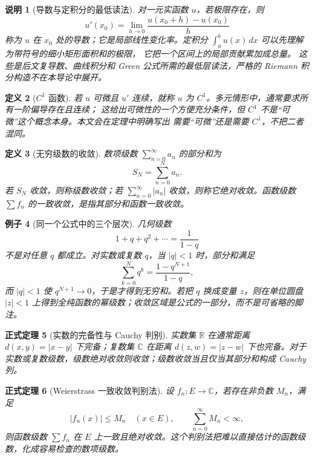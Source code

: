 \documentclass[UTF8,fontset=none,a4paper,11pt]{ctexart}
\theoremstyle{foundation-definition}
\newtheorem{definition}{定义}[section]
\theoremstyle{foundation-theorem}
\newtheorem{theorem}[definition]{正式定理}
\theoremstyle{foundation-proposition}
\theoremstyle{foundation-example}
\newtheorem{example}[definition]{例子}
\theoremstyle{foundation-remark}
\newtheorem{remark}[definition]{说明}
\theoremstyle{foundation-theorem}
\begin{document}
\begin{remark}[导数与定积分的最低读法]
对一元实函数 \(u\)，若极限存在，则
\[
u'(x_0)=\lim_{h\to0}\frac{u(x_0+h)-u(x_0)}{h}
\]
称为 \(u\) 在 \(x_0\) 处的导数；它是局部线性变化率。定积分
\(\int_a^b u(x)\,dx\) 可以先理解为带符号的细小矩形面积和的极限，
它把一个区间上的局部贡献累加成总量。
这些是后文复导数、曲线积分和 Green 公式所需的最低层读法，严格的
Riemann 积分构造不在本导论中展开。
\end{remark}

\begin{definition}[\(C^1\) 函数]\label{def:c1-function}
若 \(u\) 可微且 \(u'\) 连续，就称 \(u\) 为 \(C^1\)。多元情形中，通常要求所有一阶偏导存在且连续；
这给出可微性的一个方便充分条件，但 \(C^1\) 不是“可微”这个概念本身。本文会在定理中明确写出
需要“可微”还是需要 \(C^1\)，不把二者混同。
\end{definition}

\begin{definition}[无穷级数的收敛]\label{def:series-convergence}
数项级数 \(\sum_{n=0}^{\infty}a_n\) 的部分和为
\[
S_N=\sum_{n=0}^{N}a_n.
\]
若 \(S_N\) 收敛，则称级数收敛；若 \(\sum_{n=0}^{\infty}|a_n|\) 收敛，则称它绝对收敛。函数级数 \(\sum f_n\) 的一致收敛，是指其部分和函数一致收敛。
\end{definition}

\begin{example}[同一个公式中的三个层次]
几何级数
\[
1+q+q^2+\cdots=\frac{1}{1-q}
\]
不是对任意 \(q\) 都成立。对实数或复数 \(q\)，当 \(|q|<1\) 时，部分和满足
\[
\sum_{k=0}^{N}q^k=\frac{1-q^{N+1}}{1-q},
\]
而 \(|q|<1\) 使 \(q^{N+1}\to0\)，于是才得到无穷和。若把 \(q\) 换成变量 \(z\)，则在单位圆盘 \(|z|<1\) 上得到全纯函数的幂级数；收敛区域是公式的一部分，而不是可省略的脚注。
\end{example}

\begin{theorem}[实数的完备性与 Cauchy 判别]
实数集 \(\mathbb R\) 在通常距离 \(d(x,y)=|x-y|\) 下完备；复数集 \(\mathbb C\) 在距离 \(d(z,w)=|z-w|\) 下也完备。对于实数或复数级数，级数绝对收敛则收敛；级数收敛当且仅当其部分和构成 Cauchy 列。
\end{theorem}

\begin{theorem}[Weierstrass 一致收敛判别法]
设 \(f_n:E\to\mathbb C\)，若存在非负数 \(M_n\)，满足
\[
|f_n(x)|\leq M_n\quad(x\in E),
\qquad \sum_{n=0}^{\infty}M_n<\infty,
\]
则函数级数 \(\sum f_n\) 在 \(E\) 上一致且绝对收敛。这个判别法把难以直接估计的函数级数，化成容易检查的数项级数。
\end{theorem}
\end{document}
